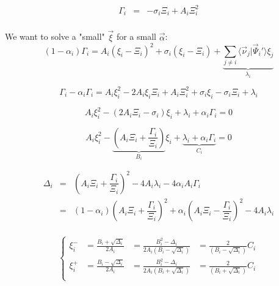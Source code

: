 \documentclass[aps,12pt]{revtex4}
\begin{document}
 \begin{equation}
 \begin{array}{rcl}
	\Gamma_i & = & -\sigma_i \Xi_i + A_i \Xi_i^2\\
\end{array}
 \end{equation}

We want to solve a "small" $\vec{\xi}$ for a small $\vec{\alpha}$:
\begin{equation}
	(1-\alpha_i) \Gamma_i = A_i(\xi_i-\Xi_i)^2 + \sigma_i(\xi_i-\Xi_i) + 
	\underbrace{\sum_{j\not=i} \langle \vec{\nu}_j \vert \vec{\Psi}_i' \rangle \xi_j}_{\lambda_i}
\end{equation}

 
\begin{equation}
\Gamma_i - \alpha_i \Gamma_i = A_i \xi_i^2 - 2 A_i \xi_i \Xi_i  + A_i \Xi_i^2 + \sigma_i \xi_i -\sigma_i \Xi_i + \lambda_i
\end{equation}

\begin{equation}
	A_i \xi_i^2 -  ( 2A_i \Xi_i - \sigma_i )  \xi_i +  {\lambda_i + \alpha_i \Gamma_i}  = 0
\end{equation}

\begin{equation}
	A_i \xi_i^2 -  \underbrace{\left( A_i \Xi_i + \dfrac{\Gamma_i}{\Xi_i} \right)}_{B_i}  \xi_i +  \underbrace{\lambda_i + \alpha_i \Gamma_i}_{C_i}  = 0
\end{equation}

\begin{equation}
\begin{array}{rcl}
	\Delta_i & = & \left( A_i \Xi_i + \dfrac{\Gamma_i}{\Xi_i} \right) ^2 - 4 A_i \lambda_i - 4 \alpha_i A_i \Gamma_i\\
	 & = & (1-\alpha_i) \left( A_i \Xi_i + \dfrac{\Gamma_i}{\Xi_i} \right) ^2 + \alpha_i \left( A_i \Xi_i - \dfrac{\Gamma_i}{\Xi_i} \right) ^2 - 4 A_i \lambda_i\\
\end{array}
\end{equation}

\begin{equation}
\left\lbrace
\begin{array}{rlll}
\xi_i^- & = \frac{B_i+\sqrt{\Delta_i}}{2A_i} & =\frac{B_i^2-\Delta_i}{2A_i(B_i-\sqrt{\Delta_i})} & = \frac{2}{(B_i-\sqrt{\Delta_i})} C_i\\
\xi_i^+ & = \frac{B_i-\sqrt{\Delta_i}}{2A_i} & = \frac{B_i^2-\Delta_i}{2A_i(B_i+\sqrt{\Delta_i})} & = \frac{2}{(B_i+\sqrt{\Delta_i})} C_i\\
\end{array}
\right.
\end{equation}
\end{document}
